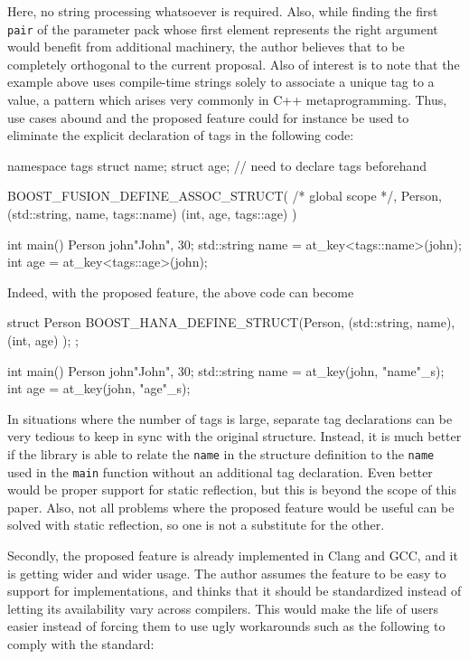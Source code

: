 \documentclass[11pt]{article}
\newcommand{\cc}[1]{\texttt{#1}}
\begin{document}
Here, no string processing whatsoever is required. Also, while finding the
first \cc{pair} of the parameter pack whose first element represents the right
argument would benefit from additional machinery, the author believes that to
be completely orthogonal to the current proposal. Also of interest is to note
that the example above uses compile-time strings solely to associate a unique
tag to a value, a pattern which arises very commonly in C++ metaprogramming.
Thus, use cases abound and the proposed feature could for instance be used to
eliminate the explicit declaration of tags in the following code:

\begin{cpp}
namespace tags { struct name; struct age; } // need to declare tags beforehand

BOOST_FUSION_DEFINE_ASSOC_STRUCT(
  /* global scope */, Person,
  (std::string, name, tags::name)
  (int, age, tags::age)
)

int main() {
    Person john{"John", 30};
    std::string name = at_key<tags::name>(john);
    int age = at_key<tags::age>(john);
}
\end{cpp}

Indeed, with the proposed feature, the above code can become

\begin{cpp}
struct Person {
  BOOST_HANA_DEFINE_STRUCT(Person,
    (std::string, name),
    (int, age)
  );
};

int main() {
  Person john{"John", 30};
  std::string name = at_key(john, "name"_s);
  int age = at_key(john, "age"_s);
}
\end{cpp}

In situations where the number of tags is large, separate tag declarations can
be very tedious to keep in sync with the original structure. Instead, it is
much better if the library is able to relate the \cc{name} in the structure
definition to the \cc{name} used in the \cc{main} function without an additional
tag declaration. Even better would be proper support for static reflection, but
this is beyond the scope of this paper. Also, not all problems where the proposed
feature would be useful can be solved with static reflection, so one is not a
substitute for the other.

Secondly, the proposed feature is already implemented in Clang and GCC, and it
is getting wider and wider usage. The author assumes the feature to be easy to
support for implementations, and thinks that it should be standardized instead
of letting its availability vary across compilers. This would make the life of
users easier instead of forcing them to use ugly workarounds such as the
following to comply with the standard:
\end{document}
